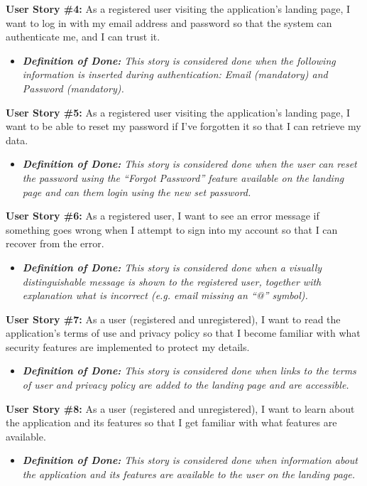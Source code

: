 \noindent \textbf{User Story \#4:} As a registered user visiting the application’s landing page, I want to log in with my email address and password so that the system can authenticate me, and I can trust it. 
\begin{itemize}
	\item \textit{\textbf{Definition of Done:} This story is considered done when the following information is inserted during authentication: Email (mandatory) and Password (mandatory).} 
\end{itemize}

\noindent \textbf{User Story \#5:} As a registered user visiting the application’s landing page, I want to be able to reset my password if I’ve forgotten it so that I can retrieve my data.
\begin{itemize}
	\item \textit{\textbf{Definition of Done:} This story is considered done when the user can reset the password using the “Forgot Password” feature available on the landing page and can them login using the new set password.} 
\end{itemize}

\noindent \textbf{User Story \#6:} As a registered user, I want to see an error message if something goes wrong when I attempt to sign into my account so that I can recover from the error.
\begin{itemize}
	\item \textit{\textbf{Definition of Done:} This story is considered done when a visually distinguishable message is shown to the registered user, together with explanation what is incorrect (e.g. email missing an “@” symbol).} 
\end{itemize}

\noindent \textbf{User Story \#7:} As a user (registered and unregistered), I want to read the application’s terms of use and privacy policy so that I become familiar with what security features are implemented to protect my details.
\begin{itemize}
	\item \textit{\textbf{Definition of Done:} This story is considered done when links to the terms of user and privacy policy are added to the landing page and are accessible.} 
\end{itemize}

\noindent \textbf{User Story \#8:} As a user (registered and unregistered), I want to learn about the application and its features so that I get familiar with what features are available.
\begin{itemize}
	\item \textit{\textbf{Definition of Done:} This story is considered done when information about the application and its features are available to the user on the landing page.} 
\end{itemize}


